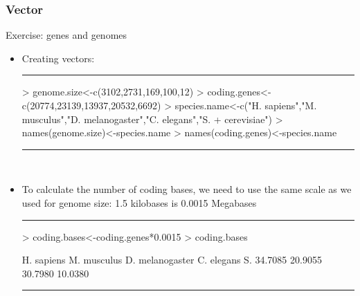 \documentclass{beamer}
\begin{document}
\begin{frame}[fragile]
	\frametitle{Vector}
	\Large Exercise: genes and genomes
	\begin{itemize}
	\small
	  \item Creating vectors:
\rule{\textwidth}{0.4pt}
\footnotesize
\begin{Schunk}
\begin{Sinput}
> genome.size<-c(3102,2731,169,100,12)
> coding.genes<-c(20774,23139,13937,20532,6692)
> species.name<-c("H. sapiens","M. musculus","D. melanogaster","C. elegans","S.
+ cerevisiae")
> names(genome.size)<-species.name
> names(coding.genes)<-species.name
\end{Sinput}
\end{Schunk}
  \rule{\textwidth}{0.4pt}\\
  \small
  \pause
    \item To calculate the number of coding bases, we need to use the same scale as we used for genome size: 1.5 kilobases is 0.0015 Megabases
\rule{\textwidth}{0.4pt}
\footnotesize
\begin{Schunk}
\begin{Sinput}
> coding.bases<-coding.genes*0.0015
> coding.bases
\end{Sinput}
\begin{Soutput}
     H. sapiens     M. musculus D. melanogaster      C. elegans  S.         34.7085         20.9055         30.7980         10.0380 
\end{Soutput}
\end{Schunk}
  \rule{\textwidth}{0.4pt}\\
	\end{itemize}
\end{frame}
\end{document}
